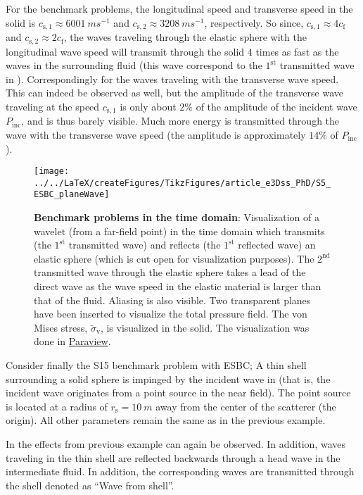 For the benchmark problems, the longitudinal speed and transverse speed in the solid is $c_{\mathrm{s},1}\approx \SI{6001}{ms^{-1}}$ and $c_{\mathrm{s},2}\approx \SI{3208}{ms^{-1}}$, respectively. So since, $c_{\mathrm{s},1}\approx 4c_{\mathrm{f}}$ and $c_{\mathrm{s},2}\approx 2c_{\mathrm{f}}$, the waves traveling through the elastic sphere with the longitudinal wave speed will transmit through the solid 4 times as fast as the waves in the surrounding fluid (this wave correspond to the $1^{\mathrm{st}}$ transmitted wave in ). Correspondingly for the waves traveling with the transverse wave speed. This can indeed be observed as well, but the amplitude of the transverse wave traveling at the speed $c_{\mathrm{s},1}$ is only about $2\%$ of the amplitude of the incident wave $P_{\mathrm{inc}}$, and is thus barely visible. Much more energy is transmitted through the wave with the transverse wave speed (the amplitude is approximately $14\%$ of $P_{\mathrm{inc}}$).
\begin{figure}
	\centering
	\texttt{[image: ../../LaTeX/createFigures/TikzFigures/article\_e3Dss\_PhD/S5\_ESBC\_planeWave]}
    \caption{\textbf{Benchmark problems in the time domain}: Visualization of a wavelet (from a far-field point) in the time domain which transmits (the $1^{\mathrm{st}}$ transmitted wave) and reflects (the $1^{\mathrm{st}}$ reflected wave) an elastic sphere (which is cut open for visualization purposes). The $2^{\mathrm{nd}}$ transmitted wave through the elastic sphere takes a lead of the direct wave as the wave speed in the elastic material is larger than that of the fluid. Aliasing is also visible. Two transparent planes have been inserted to visualize the total pressure field. The von Mises stress, $\breve{\sigma}_{\mathrm{v}}$, is visualized in the solid. The visualization was done in \href{http://www.paraview.org/}{Paraview}.}
	\label{Fig1:S5_ESBC_planeWave}
\end{figure}

Consider finally the S15 benchmark problem with ESBC; A thin shell surrounding a solid sphere is impinged by the incident wave in  (that is, the incident wave originates from a point source in the near field). The point source is located at a radius of $r_{\mathrm{s}}=\SI{10}{m}$ away from the center of the scatterer (the origin). All other parameters remain the same as in the previous example. 

In  the effects from previous example can again be observed. In addition, waves traveling in the thin shell are reflected backwards through a head wave in the intermediate fluid. In addition, the corresponding waves are transmitted through the shell denoted as ``Wave from shell''.


